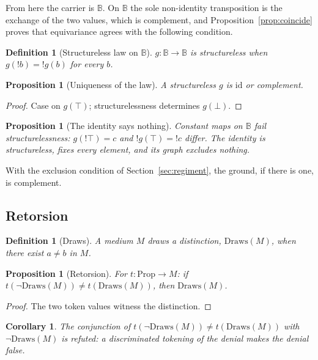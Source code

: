 \documentclass[11pt]{article}
\newtheorem{proposition}[theorem]{Proposition}
\newtheorem{definition}[theorem]{Definition}
\newtheorem{corollary}[theorem]{Corollary}
\newcommand{\Draws}{\mathrm{Draws}}
\newcommand{\B}{\mathbb{B}}
\begin{document}
From here the carrier is $\B$. On $\B$ the sole non-identity transposition is the exchange of the two values, which is complement, and Proposition~\ref{prop:coincide} proves that equivariance agrees with the following condition.

\begin{definition}[Structureless law on $\B$]
\label{def:structureless}
$g : \B \to \B$ is \emph{structureless} when $g(!b) = !g(b)$ for every $b$.
\end{definition}

\begin{proposition}[Uniqueness of the law]
\label{prop:candidate}
A structureless $g$ is $\mathrm{id}$ or complement.
\end{proposition}

\begin{proof}
Case on $g(\top)$; structurelessness determines $g(\bot)$.
\end{proof}

\begin{proposition}[The identity says nothing]
\label{prop:idmute}
Constant maps on $\B$ fail structurelessness: $g(!\top) = c$ and $!g(\top) = !c$ differ. The identity is structureless, fixes every element, and its graph excludes nothing.
\end{proposition}

With the exclusion condition of Section~\ref{sec:regiment}, the ground, if there is one, is complement.

\subsection{Retorsion}

\begin{definition}[Draws]
\label{def:draws}
A medium $M$ \emph{draws a distinction}, $\Draws(M)$, when there exist $a \neq b$ in $M$.
\end{definition}

\begin{proposition}[Retorsion]
\label{prop:retorsion}
For $t : \mathrm{Prop} \to M$: if $t(\lnot\Draws(M)) \neq t(\Draws(M))$, then $\Draws(M)$.
\end{proposition}

\begin{proof}
The two token values witness the distinction.
\end{proof}

\begin{corollary}
\label{cor:noundrawn}
The conjunction of $t(\lnot\Draws(M)) \neq t(\Draws(M))$ with $\lnot\Draws(M)$ is refuted: a discriminated tokening of the denial makes the denial false.
\end{corollary}
\end{document}
